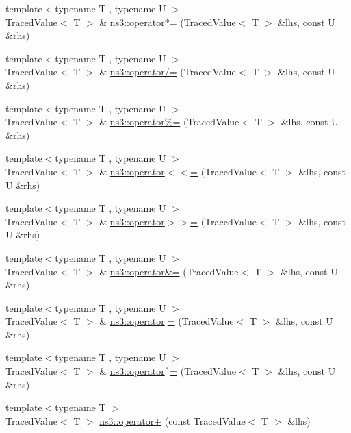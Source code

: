 \begin{DoxyCompactItemize}
\item 
{\footnotesize template$<$typename T , typename U $>$ }\\Traced\+Value$<$ T $>$ \& \hyperlink{group__tracing_ga6b5e77408427fc66a81b3668f74f2d3f}{ns3\+::operator$\ast$=} (Traced\+Value$<$ T $>$ \&lhs, const U \&rhs)
\item 
{\footnotesize template$<$typename T , typename U $>$ }\\Traced\+Value$<$ T $>$ \& \hyperlink{group__tracing_gab12fa7a2a5815f5ec54c156f5d9b8f3d}{ns3\+::operator/=} (Traced\+Value$<$ T $>$ \&lhs, const U \&rhs)
\item 
{\footnotesize template$<$typename T , typename U $>$ }\\Traced\+Value$<$ T $>$ \& \hyperlink{group__tracing_ga250a8e4b206b847e622ef67954be4a3d}{ns3\+::operator\%=} (Traced\+Value$<$ T $>$ \&lhs, const U \&rhs)
\item 
{\footnotesize template$<$typename T , typename U $>$ }\\Traced\+Value$<$ T $>$ \& \hyperlink{group__tracing_ga49b9e5adeb4dde56be6d0b263473df36}{ns3\+::operator$<$$<$=} (Traced\+Value$<$ T $>$ \&lhs, const U \&rhs)
\item 
{\footnotesize template$<$typename T , typename U $>$ }\\Traced\+Value$<$ T $>$ \& \hyperlink{group__tracing_ga0cf4268a4b7e7eb82cff101a589a0f4a}{ns3\+::operator$>$$>$=} (Traced\+Value$<$ T $>$ \&lhs, const U \&rhs)
\item 
{\footnotesize template$<$typename T , typename U $>$ }\\Traced\+Value$<$ T $>$ \& \hyperlink{group__tracing_ga8c437708edb1885d6abae7de409537a6}{ns3\+::operator\&=} (Traced\+Value$<$ T $>$ \&lhs, const U \&rhs)
\item 
{\footnotesize template$<$typename T , typename U $>$ }\\Traced\+Value$<$ T $>$ \& \hyperlink{group__tracing_ga0ba583af9008fe12ad5e5dbc3876bd3a}{ns3\+::operator$\vert$=} (Traced\+Value$<$ T $>$ \&lhs, const U \&rhs)
\item 
{\footnotesize template$<$typename T , typename U $>$ }\\Traced\+Value$<$ T $>$ \& \hyperlink{group__tracing_ga1664e28fd027d3ea11ba08c901cd6233}{ns3\+::operator$^\wedge$=} (Traced\+Value$<$ T $>$ \&lhs, const U \&rhs)
\item 
{\footnotesize template$<$typename T $>$ }\\Traced\+Value$<$ T $>$ \hyperlink{group__tracing_gaaa79c0eebff3069a01a642b6b84fd5e4}{ns3\+::operator+} (const Traced\+Value$<$ T $>$ \&lhs)

\end{DoxyCompactItemize}
